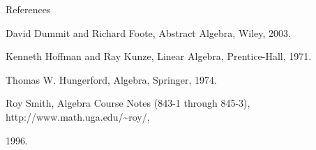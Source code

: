 \documentclass[a4paper,portrait,12pt]{article}
\begin{document}
\begin{flushleft}
References
\end{flushleft}


\begin{flushleft}
[1] David Dummit and Richard Foote, Abstract Algebra, Wiley, 2003.
\end{flushleft}


\begin{flushleft}
[2] Kenneth Hoffman and Ray Kunze, Linear Algebra, Prentice-Hall, 1971.
\end{flushleft}


\begin{flushleft}
[3] Thomas W. Hungerford, Algebra, Springer, 1974.
\end{flushleft}


\begin{flushleft}
[4] Roy Smith, Algebra Course Notes (843-1 through 845-3), http://www.math.uga.edu/\~{}roy/,
\end{flushleft}


1996.


\begin{flushleft}
\end{flushleft}





\newpage
\newpage
\end{document}
